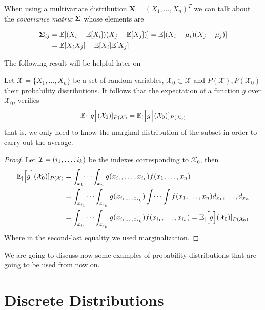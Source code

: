 When using a multivariate distribution \(\bm{X} = (X_1,\dots,X_n)^T\) we can talk about the \emph{covariance
  matrix} \(\bm{\Sigma} \) whose elements are

\[
\begin{aligned}
\bm{\Sigma}_{ij} &= \mathbb{E}[ (X_i - \mathbb{E}[X_i])
(X_j - \mathbb{E}[X_j]) ] = \mathbb{E}[(X_i - \mu_i)(X_j - \mu_j)]\\
&=\mathbb{E}[X_iX_j]-\mathbb{E}[X_i]\mathbb{E}[X_j]
\end{aligned}
\]

The following result will be helpful later on

\begin{proposition}
  Let \(\mathcal{X} = \{X_1,\dots,X_n\}\) be a set of random variables,
  \(\mathcal{X}_{0} \subset \mathcal{X}\) and \(P(\mathcal{X}), P(\mathcal{X}_{0})\)
  their probability distributions.
  It follows that the expectation of a function \(g\) over \(\mathcal{X}_0\), verifies
    \[
      \mathbb{E}_{[}\Big[g\Big](\mathcal{X}_0)]_{P(\mathcal{X})} = \mathbb{E}_{[}\Big[g\Big](\mathcal{X}_0)]_{P(\mathcal{X}_0)}
    \]
    that is, we only need to know the marginal distribution of the subset in
    order to carry out the average.
\end{proposition}

\begin{proof}
  Let \(\mathcal{I} = (i_{1}, \dots, i_{k})\) be the indexes corresponding to \(\mathcal{X}_{0}\), then
  \[
    \begin{aligned}
      \mathbb{E}_{[}\Big[g\Big](\mathcal{X}_{0})]_{P(\mathcal{X})} &= \int_{x_{1}}\dots\int_{x_{n}}g(x_{i_{1}},\dots,x_{i_{k}})f(x_{1},\dots,x_{n}) \\
      &= \int_{x_{i_{1}}}\dots\int_{x_{i_{k}}} g(x_{i_{1},\dots,x_{i_{k}}}) \int \dots \int f(x_{1},\dots,x_{n}) d_{x_{1}},\dots,d_{x_{n}}\\
      &= \int_{x_{i_{1}}}\dots\int_{x_{i_{k}}} g(x_{i_{1},\dots,x_{i_{k}}}) f(x_{i_{1}},\dots,x_{i_{k}}) =  \mathbb{E}_{[}\Big[g\Big](\mathcal{X}_{0})]_{P(\mathcal{X}_{0})} \\
      \end{aligned}
  \]
Where in the second-last equality we used marginalization.
\end{proof}

We are going to discuss now some examples of probability distributions that are
going to be used from now on.

\section{Discrete Distributions}


